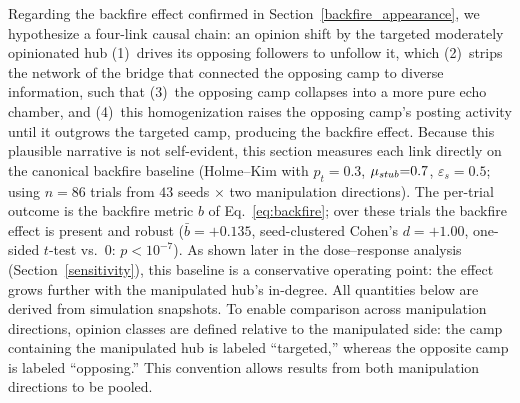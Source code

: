 \documentclass[pdflatex,sn-mathphys-num]{sn-jnl}%
\theoremstyle{thmstyleone}%
\theoremstyle{thmstyletwo}%
\theoremstyle{thmstylethree}%
\def\Stubbornness{\mu_{\it stub}}
\def\ThofOpPreval{\varepsilon_s}
\begin{document}
Regarding the backfire effect confirmed in Section~\ref{backfire_appearance},
we hypothesize a four-link
causal chain: an opinion shift by the targeted moderately opinionated hub (1)~drives its opposing
followers to unfollow it, which (2)~strips the network of the bridge that
connected the opposing camp to diverse information, such that (3)~the opposing camp
collapses into a more pure echo chamber, and (4)~this homogenization raises the
opposing camp's posting activity until it outgrows the targeted camp, producing the
backfire effect. Because this plausible narrative is not self-evident, this section measures
each link directly on the canonical backfire baseline (Holme--Kim with
$p_t{=}0.3$, $\Stubbornness{=}0.7$, $\ThofOpPreval{=}0.5$; using $n{=}86$ trials from
$43$ seeds $\times$ two manipulation directions).
The per-trial outcome is the
backfire metric $b$ of Eq.~\eqref{eq:backfire}; over these trials the backfire effect is
present and robust ($\bar b = +0.135$, seed-clustered Cohen's $d = +1.00$, one-sided $t$-test
vs.\ $0$: $p < 10^{-7}$). As shown later in the dose--response analysis (Section~\ref{sensitivity}),
this baseline is a conservative
operating point: the effect grows further with the manipulated hub's in-degree.
All quantities below are derived from simulation snapshots.
To enable comparison across manipulation directions, opinion classes are defined
relative to the manipulated side: the camp containing the manipulated hub is
labeled ``targeted,'' whereas the opposite camp is labeled ``opposing.''
This convention allows results from both manipulation directions to be pooled.
\par
\end{document}
